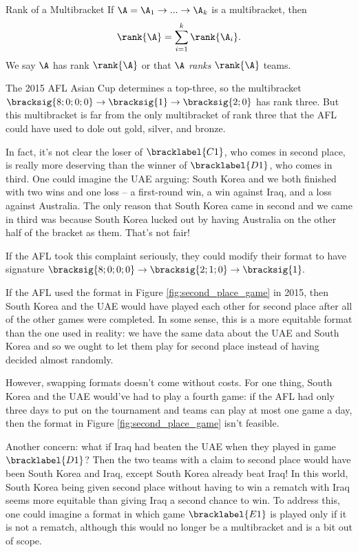 {    \begin{definition}{Rank of a Multibracket}{}
        If $\A = \A_1 \to ... \to \A_k$ is a multibracket, then $$\rank{\A} = \sum_{i=1}^k \rank{\A_i}.$$ We say $\A$ has rank $\rank{\A}$ or that $\A$ \textit{ranks} $\rank{\A}$ teams.
    \end{definition}

    The 2015 AFL Asian Cup determines a top-three, so the multibracket $\bracksig{8;0;0;0} \to \bracksig{1} \to \bracksig{2;0}$ has rank three. But this multibracket is far from the only multibracket of rank three that the AFL could have used to dole out gold, silver, and bronze.
    
    In fact, it's not clear the loser of $\bracklabel{C1}$, who comes in second place, is really more deserving than the winner of $\bracklabel{D1}$, who comes in third. One could imagine the UAE arguing: South Korea and we both finished with two wins and one loss -- a first-round win, a win against Iraq, and a loss against Australia. The only reason that South Korea came in second and we came in third was because South Korea lucked out by having Australia on the other half of the bracket as them. That's not fair!

    If the AFL took this complaint seriously, they could modify their format to have signature $\bracksig{8;0;0;0} \to \bracksig{2; 1; 0} \to \bracksig{1}.$
    

    If the AFL used the format in Figure \ref{fig:second_place_game} in 2015, then South Korea and the UAE would have played each other for second place after all of the other games were completed. In some sense, this is a more equitable format than the one used in reality: we have the same data about the UAE and South Korea and so we ought to let them play for second place instead of having decided almost randomly.

    However, swapping formats doesn't come without costs. For one thing, South Korea and the UAE would've had to play a fourth game: if the AFL had only three days to put on the tournament and teams can play at most one game a day, then the format in Figure \ref{fig:second_place_game} isn't feasible.

    Another concern: what if Iraq had beaten the UAE when they played in game $\bracklabel{D1}$? Then the two teams with a claim to second place would have been South Korea and Iraq, except South Korea already beat Iraq! In this world, South Korea being given second place without having to win a rematch with Iraq seems more equitable than giving Iraq a second chance to win. To address this, one could imagine a format in which game $\bracklabel{E1}$ is played only if it is not a rematch, although this would no longer be a multibracket and is a bit out of scope.

}
